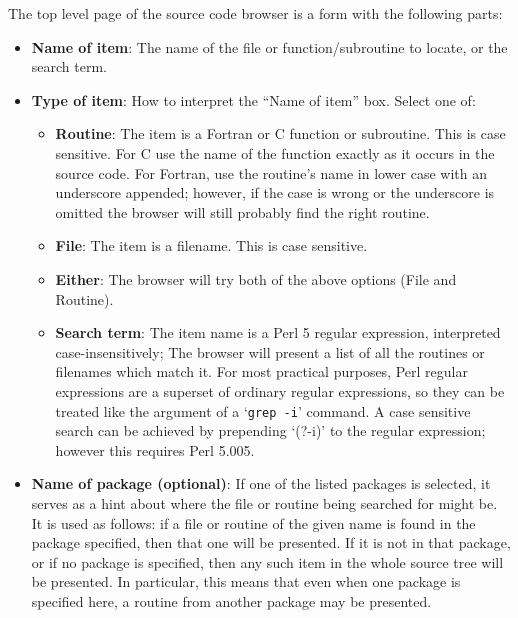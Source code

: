 \documentclass[twoside,11pt]{article}
\renewcommand{\_}{\texttt{\symbol{95}}}
\begin{document}
The top level page of the source code browser is a form
with the following parts:
\begin{itemize}
\item {\bf Name of item}:
The name of the file or function/subroutine to locate, or the search term.
\item {\bf Type of item}:
How to interpret the ``Name of item'' box.  Select one of:
\begin{itemize}
   \item {\bf Routine}:
   The item is a Fortran or C function or subroutine.
   This is case sensitive.
   For C use the name of the function exactly as it occurs in the source code.
   For Fortran, use the routine's name in lower case with an 
   underscore appended;
   however, if the case is wrong or the underscore is omitted the 
   browser will still probably 
   find the right routine.
   \item {\bf File}:
   The item is a filename.  This is case sensitive.
   \item {\bf Either}:
   The browser will try both of the above options (File and Routine).
   \item {\bf Search term}:
   The item name is a Perl 5 regular expression, interpreted case-insensitively;
   The browser will present a list of all the routines or filenames 
   which match it.
   For most practical purposes, Perl regular expressions are a superset
   of ordinary regular expressions, so they can be treated like the 
   argument of a `{\tt grep -i}' command.
   A case sensitive search can be achieved by prepending `(?-i)' to the
   regular expression; however this requires Perl 5.005.
\end{itemize}
\item {\bf Name of package (optional)}:
If one of the listed packages is selected, it serves
as a hint about where the file or routine being searched for might be.
It is used as follows: if a file or routine of the given name is found
in the package specified, then that one will be presented.
If it is not in that package, or if no package is specified, 
then any such item in the whole source tree will be presented.
In particular, this means that even when one package is specified here,
a routine from another package may be presented.
\end{itemize}
\end{document}
